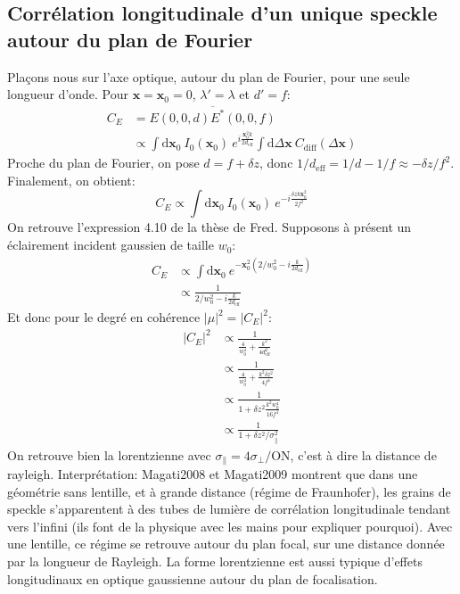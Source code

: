\subsection{Corrélation longitudinale d'un unique speckle autour du plan de Fourier}
Plaçons nous sur l'axe optique, autour du plan de Fourier, pour une seule longueur d'onde. Pour $\mathbf{x}=\mathbf{x}_0=0$, $\lambda'=\lambda$ et $d'=f$:
\begin{align}
C_E&=\overline{E(0,0,d)E^*(0,0,f)} \\
& \propto \int{\mathrm{d}\mathbf{x}_0 \: I_0(\mathbf{x}_0) \: e^{i\frac{\mathbf{x}_0^2 k}{2 d_{\mathrm{eff}}}} \int{\mathrm{d}\Delta\mathbf{x} \: C_{\mathrm{diff}}(\Delta\mathbf{x})}}
\end{align}
Proche du plan de Fourier, on pose $d=f+\delta z$, donc $1/d_{\mathrm{eff}}=1/d-1/f\approx-\delta z/f^2$. Finalement, on obtient:
\begin{equation}
C_E \propto \int{\mathrm{d}\mathbf{x}_0 \: I_0(\mathbf{x}_0) \: e^{-i\frac{\delta z k \mathbf{x}_0^2}{2f^2}}}
\end{equation}
On retrouve l'expression 4.10 de la thèse de Fred. Supposons à présent un éclairement incident gaussien de taille $w_0$:
\begin{align}
C_E &\propto \int{\mathrm{d}\mathbf{x}_0 \: e^{-\mathbf{x}_0^2 \left( 2/w_0^2-i\frac{k}{2d_{\mathrm{eff}}}\right)}} \\
&\propto \frac{1}{2/w_0^2-i\frac{k}{2d_{\mathrm{eff}}}}
\end{align}
Et donc pour le degré en cohérence $\left| \mu \right|^2=\left| C_E \right|^2$:
\begin{align}
\left| C_E \right| ^2 &\propto \frac{1}{\frac{4}{w_0^4}+\frac{k^2}{4d_{\mathrm{eff}}^2}} \\
&\propto \frac{1}{\frac{4}{w_0^4}+\frac{k^2 \delta z^2}{4f^4}} \\
&\propto \frac{1}{1+\delta z^2 \frac{k^2 w_0^4}{16f^4}} \\
&\propto \frac{1}{1+\delta z^2/\sigma_{\parallel}^2}
\end{align}
On retrouve bien la lorentzienne avec $\sigma_{\parallel}=4 \sigma_{\perp} / \mathrm{ON}$, c'est à dire la distance de rayleigh. Interprétation: Magati2008 et Magati2009 montrent que dans une géométrie sans lentille, et à grande distance (régime de Fraunhofer), les grains de speckle s'apparentent à des tubes de lumière de corrélation longitudinale tendant vers l'infini (ils font de la physique avec les mains pour expliquer pourquoi). Avec une lentille, ce régime se retrouve autour du plan focal, sur une distance donnée par la longueur de Rayleigh. La forme lorentzienne est aussi typique d'effets longitudinaux en optique gaussienne autour du plan de focalisation.

